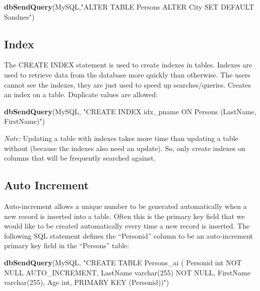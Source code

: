 \documentclass[
]{book}
\newenvironment{Shaded}{\begin{snugshade}}{\end{snugshade}}
\newcommand{\FunctionTok}[1]{\textcolor[rgb]{0.13,0.29,0.53}{\textbf{#1}}}
\newcommand{\NormalTok}[1]{#1}
\newcommand{\StringTok}[1]{\textcolor[rgb]{0.31,0.60,0.02}{#1}}
\begin{document}
\begin{Shaded}
\begin{Highlighting}[]
\FunctionTok{dbSendQuery}\NormalTok{(MySQL,}\StringTok{"ALTER TABLE Persons}
\StringTok{                        ALTER City SET DEFAULT \textquotesingle{}Sandnes\textquotesingle{}"}\NormalTok{)}
\end{Highlighting}
\end{Shaded}

\hypertarget{index}{%
\subsection{Index}\label{index}}

The CREATE INDEX statement is used to create indexes in tables. Indexes are used to retrieve data from the database more quickly than otherwise. The users cannot see the indexes, they are just used to speed up searches/queries. Creates an index on a table. Duplicate values are allowed:

\begin{Shaded}
\begin{Highlighting}[]
\FunctionTok{dbSendQuery}\NormalTok{(MySQL, }\StringTok{"CREATE INDEX idx\_pname}
\StringTok{                   ON Persons (LastName, FirstName)"}\NormalTok{)}
\end{Highlighting}
\end{Shaded}

\emph{Note:} Updating a table with indexes takes more time than updating a table without (because the indexes also need an update). So, only create indexes on columns that will be frequently searched against.

\hypertarget{auto-increment}{%
\subsection{Auto Increment}\label{auto-increment}}

Auto-increment allows a unique number to be generated automatically when a new record is inserted into a table. Often this is the primary key field that we would like to be created automatically every time a new record is inserted. The following SQL statement defines the ``Personid'' column to be an auto-increment primary key field in the ``Persons'' table:

\begin{Shaded}
\begin{Highlighting}[]
\FunctionTok{dbSendQuery}\NormalTok{(MySQL,}
\StringTok{"CREATE TABLE Persons\_ai (}
\StringTok{    Personid int NOT NULL AUTO\_INCREMENT,}
\StringTok{    LastName varchar(255) NOT NULL,}
\StringTok{    FirstName varchar(255),}
\StringTok{    Age int,}
\StringTok{    PRIMARY KEY (Personid))"}\NormalTok{)}
\end{Highlighting}
\end{Shaded}
\end{document}
